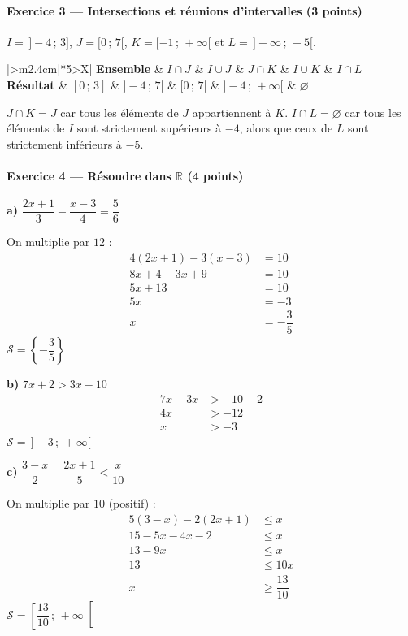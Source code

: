 \documentclass[11pt,a4paper]{article}
\newcommand{\R}{\mathbb{R}}
\renewcommand{\S}{\mathcal{S}}
\newcommand{\exo}[3]{\paragraph{Exercice #1 --- #2 \hfill\normalfont\small(#3 points)}}
\newcommand{\rep}[1]{\textbf{#1}}
\newcommand{\tableauintervalles}[5]{%
  \begin{center}
  \renewcommand{\arraystretch}{1.5}
  \begin{tabularx}{\linewidth}{|>{\centering\arraybackslash}m{2.4cm}|*{5}{>{\centering\arraybackslash}X|}}
    \hline
    \textbf{Ensemble} & $I\cap J$ & $I\cup J$ & $J\cap K$ & $I\cup K$ & $I\cap L$ \\
    \hline
    \textbf{Résultat} & $#1$ & $#2$ & $#3$ & $#4$ & $#5$ \\
    \hline
  \end{tabularx}
  \end{center}
}
\begin{document}
\exo{3}{Intersections et réunions d'intervalles}{3}
$I = \,]-4\,;\,3]$, \quad $J = [0\,;\,7[$, \quad $K = [-1\,;\,+\infty[$ \quad et \quad $L = \,]-\infty\,;\,-5[$.
\tableauintervalles{[0\,;\,3]}{]-4\,;\,7[}{[0\,;\,7[}{]-4\,;\,+\infty[}{\varnothing}
$J \cap K = J$ car tous les éléments de $J$ appartiennent à $K$. \quad
$I \cap L = \varnothing$ car tous les éléments de $I$ sont strictement supérieurs à $-4$, alors que ceux de $L$ sont strictement inférieurs à $-5$.

\exo{4}{Résoudre dans $\R$}{4}
\begin{minipage}[t]{0.31\linewidth}
\rep{a)} $\dfrac{2x+1}{3} - \dfrac{x-3}{4} = \dfrac{5}{6}$

On multiplie par $12$ :
\begin{align*}
4(2x+1) - 3(x-3) &= 10\\
8x + 4 - 3x + 9 &= 10\\
5x + 13 &= 10\\
5x &= -3\\
x &= -\dfrac{3}{5}
\end{align*}
$\S = \left\{-\dfrac{3}{5}\right\}$

\end{minipage}\hfill
\begin{minipage}[t]{0.31\linewidth}
\rep{b)} $7x + 2 > 3x - 10$
\begin{align*}
7x - 3x &> -10 - 2\\
4x &> -12\\
x &> -3
\end{align*}
$\S = \,]-3\,;\,+\infty[$

\end{minipage}\hfill
\begin{minipage}[t]{0.31\linewidth}
\rep{c)} $\dfrac{3-x}{2} - \dfrac{2x+1}{5} \leqslant \dfrac{x}{10}$

On multiplie par $10$ (positif) :
\begin{align*}
5(3-x) - 2(2x+1) &\leqslant x\\
15 - 5x - 4x - 2 &\leqslant x\\
13 - 9x &\leqslant x\\
13 &\leqslant 10x\\
x &\geqslant \dfrac{13}{10}
\end{align*}
$\S = \left[\dfrac{13}{10}\,;\,+\infty\right[$
\end{minipage}
\end{document}
